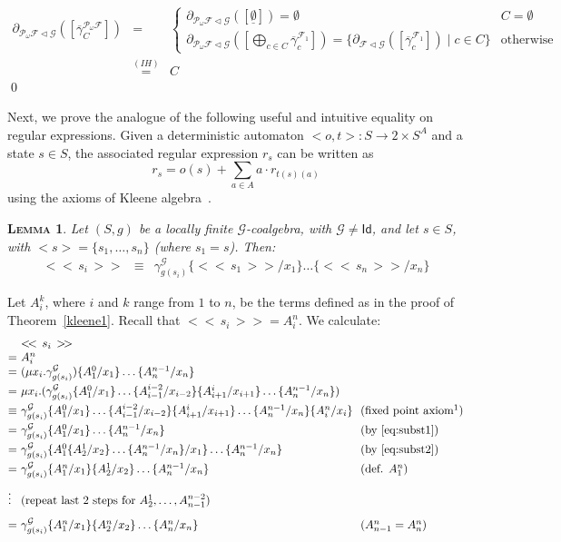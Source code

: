 \documentclass{LMCS}
\def\pow{{\mathcal P_{\!\!\!\omega}}}
\newcommand\id{\mathsf{Id}}
\newcommand\G{\mathcal{G}}
\newcommand\F{\mathcal{F}}
\newcommand\emp{\underline\emptyset}
\def\expr#1{<\!< \, #1 \, >\!>}
\theoremstyle{definition}
\theoremstyle{plain}
\newtheorem{mylemma}[mydefinition]{\textsc{Lemma}}
\theoremstyle{plain}
\theoremstyle{plain}
\theoremstyle{plain}
\theoremstyle{definition}
\theoremstyle{definition}
\newenvironment{lemma}{
\begin{mylemma}}
    {\end{mylemma}}
\begin{document}
\[
\begin{array}{lcl}
\partial_{\pow \F \lhd \G}([\overline\gamma^{\pow \F}_{C}])&=&
\begin{cases} \partial_{\pow \F \lhd
\G}([\emp])= \emptyset & C=\emptyset\\
\partial_{\pow \F \lhd
\G}([\bigoplus_{c\in C}\overline\gamma^{\F_1}_{c}])=\{\partial_{\F \lhd
\G}([\overline\gamma^{\F_1}_{c}])\mid c\in C\} &
\text{otherwise}\end{cases} \\
&\stackrel {(\mathit{IH})}=& C
\end{array}
\]
\qed


Next, we prove the analogue of the following useful and intuitive
equality on regular expressions. Given a deterministic
automaton $<o,t>\colon S\to 2\times S^A$ and a state $s\in S$, the
associated regular expression $r_s$  can be written as
\begin{equation}\label{eq:regexp_decomp}
r_s = o(s) + \sum_{a\in A} a\cdot r_{t(s)(a)}
\end{equation}
using the axioms of Kleene algebra~\cite[Theorem 4.4]{Brz64}.
\begin{lemma}\label{lemma:gamma}
Let $(S,g)$ be a locally finite $\G$-coalgebra, with $\G\neq \id$, and let $s\in S$, with
$<s>=\{s_1,\ldots,s_n\}$ (where $s_1=s$). Then:
\begin{eqnarray}\label{gamma_eq} 
\expr{s_i} &\equiv& \gamma_{g(s_i)}^\G \{\expr {s_1}/x_1\} \ldots \{\expr
{s_n}/x_n\}
\end{eqnarray}
\end{lemma}
\proof 
Let $A_i^k$, where $i$ and $k$ range from $1$ to $n$, be the terms
defined as in the proof of Theorem~\ref{kleene1}. Recall that
$\expr{s_i}=A^n_i$. We calculate:
\[
\begin{array}{@{}l@{\ }l@{\ \ }l@{}}
& \expr{ s_i }\\ = & A^n_i \\
=& (\mu x_i. \gamma^\G_{g(s_i)}) \{A^0_1/x_1\} \ldots
\{A_n^{n-1}/x_n\}\\[1ex] 
=& \mu x_i. (\gamma^\G_{g(s_i)} \{A^0_1/x_1\} \ldots
\{A_{i-1}^{i-2}/x_{i-2}\}\{A^i_{i+1}/x_{i+1}\} \ldots \{A_n^{n-1}/x_n\}
)\\[1ex] 
\equiv& \gamma^\G_{g(s_i)} \{A^0_1/x_1\} \ldots
\{A_{i-1}^{i-2}/x_{i-2}\}\{A^i_{i+1}/x_{i+1}\} \ldots \{A_n^{n-1}/x_n\}
\{A^n_i/x_i\} &\text{(fixed point axiom\footnotemark )}\\[1ex] 
=& \gamma^\G_{g(s_i)} \{A^0_1/x_1\} \ldots \{A_n^{n-1}/x_n\} &  \text{(by
\ref{eq:subst1})}\\[1ex] 
=&  \gamma^\G_{g(s_i)} \{A^0_1\{A^1_2/x_2\}\ldots \{A_n^{n-1}/x_n\}/x_1\} \ldots \{A_n^{n-1}/x_n\} &  \text{(by
\ref{eq:subst2})}\\[1ex] 
=&  \gamma^\G_{g(s_i)} \{A^n_1/x_1\}\{A_2^1/x_2\}
\ldots \{A_n^{n-1}/x_n\} &  \text{(def. $A_1^{n}$)}\\[2ex] 
\vdots& \text{(repeat last 2 steps for $A_2^1,\ldots,
A_{n-1}^{n-2}$)}\\[2ex]
=&  \gamma^\G_{g(s_i)} \{A^n_1/x_1\}\{A_2^n/x_2\}
\ldots \{A_n^n/x_n\} &  \text{($A_{n-1}^{n} = A^n_n$)}\\
\end{array}
\]
\end{document}
